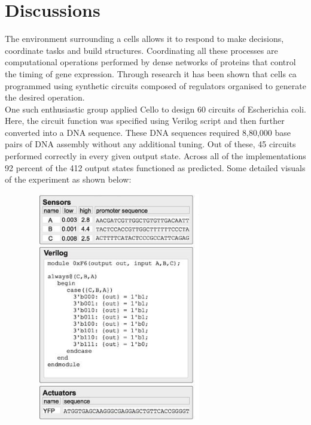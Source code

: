 \documentclass[11pt]{article}
\begin{document}
\section*{Discussions}
The environment surrounding a cells allows it to respond to make decisions, coordinate tasks and build structures. Coordinating all these processes are computational operations performed by dense networks of proteins that control the timing of gene expression. Through research\cite{journal}
 it has been shown that cells ca programmed using synthetic circuits composed of regulators organised to generate the desired operation. 
\\[\baselineskip]  One such enthusiastic group applied Cello to design 60 circuits of Escherichia coli. Here, the circuit function was specified using Verilog script and then further converted into a DNA sequence. These DNA sequences required 8,80,000 base pairs of DNA assembly without any additional tuning. Out of these, 45 circuits performed correctly in every given output state. Across all of the implementations 92 percent of the 412 output states functioned as predicted. Some detailed visuals of the experiment as shown below:
\begin{figure}[ht!]
\centering
\includegraphics[width=8cm,height=10cm,keepaspectratio]{discussion1.jpg}
\label{d_input}
\end{figure}
\end{document}
